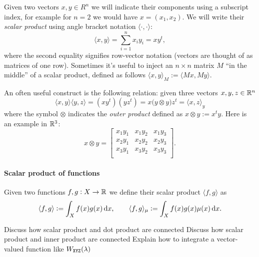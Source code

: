Given two vectors $x,y \in R^n$ we will indicate their components using a
subscript index,
for example for $n=2$ we would have $x = (x_1, x_2)$.
We will write their \textsl{scalar product} using angle bracket notation
$\langle \cdot, \cdot \rangle$:
\begin{displaymath}
\langle x, y \rangle = \sum_{i=1}^n x_i y_i = xy^t,
\end{displaymath}
where the second equality signifies row-vector notation (vectors are thought
of as matrices of one row). Sometimes it's useful to inject an $n\times n$ matrix $M$ ``in the middle''
of a scalar product, defined as follows $\langle x, y \rangle_M := \langle M x, M y \rangle$.

An often useful construct is the following relation: given
three vectors $x,y,z \in \mathbb{R}^n$
\begin{displaymath}
\langle x,y \rangle \langle y,z \rangle
  = \left(x y^t\right)\left(y z^t\right)
  = x \big(y \otimes y\big) z^t
  = \langle x, z\rangle_y
\end{displaymath}
where the symbol $\otimes$ indicates the \textsl{outer product} defined as $x\otimes y :=
x^t y$. Here is an example in $\mathbb{R}^3$:
\begin{displaymath}
x\otimes y =
\left[
\begin{array}{ccc}
x_1 y_1 & x_1 y_2 & x_1 y_3 \\
x_2 y_1 & x_2 y_2 & x_2 y_3 \\
x_3 y_1 & x_3 y_2 & x_3 y_3 \\
\end{array}
\right].
\end{displaymath}


\paragraph{Scalar product of functions}
Given two functions $f,g:X\to\mathbb{R}$ we define their scalar product
$\langle f, g \rangle$ as
\begin{displaymath}
\langle f, g \rangle := \int_X f(x)g(x) \mathop{}\!\mathrm{d} x, \qquad \langle f, g \rangle_\mu := \int_X f(x)g(x)\mu(x) \mathop{}\!\mathrm{d} x.
\end{displaymath}

\begin{inconstruction}
	Discuss how scalar product and dot product are connected
	Discuss how scalar product and inner product are connected
	Explain how to integrate a vector-valued function like $W_{\texttt{XYZ}}(\lambda)$ 
\end{inconstruction}

